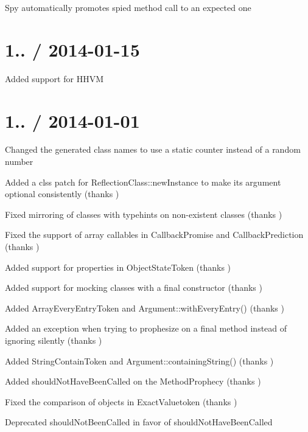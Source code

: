 \begin{DoxyItemize}
\item Spy automatically promotes spied method call to an expected one
\end{DoxyItemize}

\section*{1.. / 2014-\/01-\/15 }


\begin{DoxyItemize}
\item Added support for H\+H\+VM
\end{DoxyItemize}

\section*{1.. / 2014-\/01-\/01 }


\begin{DoxyItemize}
\item Changed the generated class names to use a static counter instead of a random number
\item Added a clss patch for Reflection\+Class\+::new\+Instance to make its argument optional consistently (thanks )
\item Fixed mirroring of classes with typehints on non-\/existent classes (thanks )
\item Fixed the support of array callables in Callback\+Promise and Callback\+Prediction (thanks )
\item Added support for properties in Object\+State\+Token (thanks )
\item Added support for mocking classes with a final constructor (thanks )
\item Added Array\+Every\+Entry\+Token and Argument\+::with\+Every\+Entry() (thanks )
\item Added an exception when trying to prophesize on a final method instead of ignoring silently (thanks )
\item Added String\+Contain\+Token and Argument\+::containing\+String() (thanks )
\item Added {\ttfamily should\+Not\+Have\+Been\+Called} on the Method\+Prophecy (thanks )
\item Fixed the comparison of objects in Exact\+Valuetoken (thanks )
\item Deprecated {\ttfamily should\+Not\+Been\+Called} in favor of {\ttfamily should\+Not\+Have\+Been\+Called}
\end{DoxyItemize}


